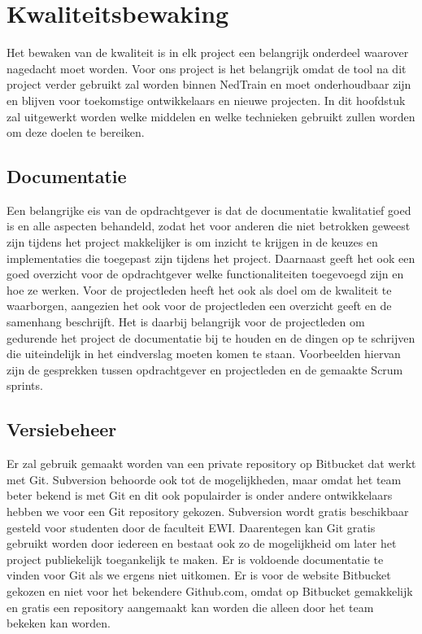 \section{Kwaliteitsbewaking}
Het bewaken van de kwaliteit is in elk project een belangrijk onderdeel waarover nagedacht moet worden. Voor ons project is het belangrijk omdat de tool na dit project verder gebruikt zal worden binnen NedTrain en moet onderhoudbaar zijn en blijven voor toekomstige ontwikkelaars en nieuwe projecten. In dit hoofdstuk zal uitgewerkt worden welke middelen en welke technieken gebruikt zullen worden om deze doelen te bereiken.

\subsection{Documentatie}
Een belangrijke eis van de opdrachtgever is dat de documentatie kwalitatief goed is en alle aspecten behandeld, zodat het voor anderen die niet betrokken geweest zijn tijdens het project makkelijker is om inzicht te krijgen in de keuzes en implementaties die toegepast zijn tijdens het project. Daarnaast geeft het ook een goed overzicht voor de opdrachtgever welke functionaliteiten toegevoegd zijn en hoe ze werken. Voor de projectleden heeft het ook als doel om de kwaliteit te waarborgen, aangezien het ook voor de projectleden een overzicht geeft en de samenhang beschrijft. Het is daarbij belangrijk voor de projectleden om gedurende het project de documentatie bij te houden en de dingen op te schrijven die uiteindelijk in het eindverslag moeten komen te staan. Voorbeelden hiervan zijn de gesprekken tussen opdrachtgever en projectleden en de gemaakte Scrum sprints.

\subsection{Versiebeheer}
Er zal gebruik gemaakt worden van een private repository op Bitbucket dat werkt met Git. Subversion behoorde ook tot de mogelijkheden, maar omdat het team beter bekend is met Git en dit ook populairder is onder andere ontwikkelaars hebben we voor een Git repository gekozen. Subversion wordt gratis beschikbaar gesteld voor studenten door de faculteit EWI. Daarentegen kan Git gratis gebruikt worden door iedereen en bestaat ook zo de mogelijkheid om later het project publiekelijk toegankelijk te maken. Er is voldoende documentatie te vinden voor Git als we ergens niet uitkomen. Er is voor de website Bitbucket gekozen en niet voor het bekendere Github.com, omdat op Bitbucket gemakkelijk en gratis een repository aangemaakt kan worden die alleen door het team bekeken kan worden. 

